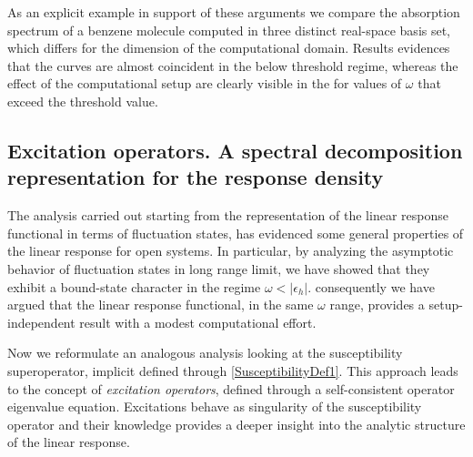\documentclass[reprint,aps,prb]{revtex4-1}
\newcommand{\eps}{\epsilon}
\begin{document}
As an explicit example in support of these arguments we compare the absorption spectrum of a benzene molecule computed in three distinct real-space basis set, which differs for the 
dimension of the computational domain. Results evidences that the curves are almost coincident in the below threshold regime, whereas the effect of the computational setup are clearly
visible in the for values of $\omega$ that exceed the threshold value. 


\vspace{0.3cm}
\vspace{0.3cm}


\subsection{Excitation operators. A spectral decomposition representation for the response density}

The analysis carried out starting from the representation of the linear response functional in terms of fluctuation states, has evidenced some general properties of the linear response
for open systems. In particular, by analyzing the asymptotic behavior of fluctuation states in long range limit, we have showed that they exhibit a bound-state character in the regime  
$\omega<|\eps_h|$. consequently we have argued that the linear response functional, in the same $\omega$ range, provides a setup-independent result with a modest computational effort. 

Now we reformulate an analogous analysis looking at the susceptibility superoperator, implicit defined through \eqref{SusceptibilityDef1}. This approach leads to the concept of \emph{excitation 
operators}, defined through a self-consistent operator eigenvalue equation. Excitations behave as singularity of the susceptibility operator and their knowledge provides a deeper insight 
into the analytic structure of the linear response. 
\end{document}
